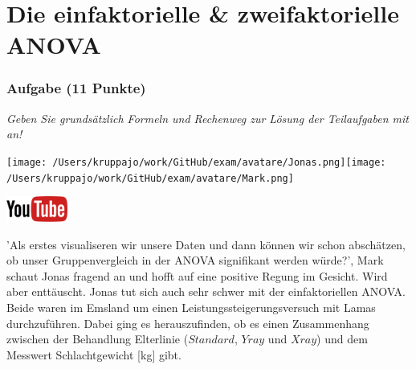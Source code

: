 \documentclass[a4paper, 9pt]{scrartcl}\usepackage[]{graphicx}\usepackage[]{xcolor}
\begin{document}
\part{Die einfaktorielle \& zweifaktorielle ANOVA}

\section{Aufgabe \hfill (11 Punkte)}

\textit{Geben Sie grundsätzlich Formeln und Rechenweg zur Lösung der Teilaufgaben mit an!} \\[1Ex]
 

 
\begin{minipage}[t]{0.5\textwidth}
\texttt{[image: /Users/kruppajo/work/GitHub/exam/avatare/Jonas.png]}\hspace{-4mm}\texttt{[image: /Users/kruppajo/work/GitHub/exam/avatare/Mark.png]}
\end{minipage}
\begin{minipage}[t]{0.5\textwidth}
\hfill
\href{https://youtu.be/kHmfEmU6lrk}{\includegraphics[width = 2cm]{img/youtube}}
\end{minipage}
\vspace{1ex}



'Als erstes visualiseren wir unsere Daten und dann können wir schon abschätzen, ob unser Gruppenvergleich in der ANOVA signifikant werden würde?', Mark schaut Jonas fragend an und hofft auf eine positive Regung im Gesicht. Wird aber enttäuscht. Jonas tut sich auch sehr schwer mit der einfaktoriellen ANOVA. Beide waren im Emsland um einen Leistungssteigerungsversuch mit Lamas durchzuführen. Dabei ging es herauszufinden, ob es einen Zusammenhang zwischen der Behandlung Elterlinie ($Standard$, $Yray$ und $Xray$) und dem Messwert Schlachtgewicht [kg] gibt.
\end{document}
